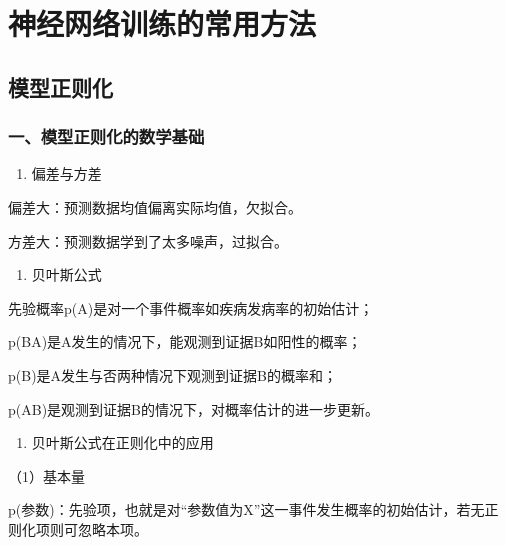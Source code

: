 \hypertarget{ux795eux7ecfux7f51ux7edcux8badux7ec3ux7684ux5e38ux7528ux65b9ux6cd5}{%
\chapter{神经网络训练的常用方法}\label{ux795eux7ecfux7f51ux7edcux8badux7ec3ux7684ux5e38ux7528ux65b9ux6cd5}}

\hypertarget{ux6a21ux578bux6b63ux5219ux5316}{%
\section{模型正则化}\label{ux6a21ux578bux6b63ux5219ux5316}}

\hypertarget{ux4e00ux6a21ux578bux6b63ux5219ux5316ux7684ux6570ux5b66ux57faux7840}{%
\subsection{一、模型正则化的数学基础}\label{ux4e00ux6a21ux578bux6b63ux5219ux5316ux7684ux6570ux5b66ux57faux7840}}

\begin{enumerate}
\def\labelenumi{\arabic{enumi}.}
\tightlist
\item
  偏差与方差
\end{enumerate}

偏差大：预测数据均值偏离实际均值，欠拟合。

方差大：预测数据学到了太多噪声，过拟合。

\begin{enumerate}
\def\labelenumi{\arabic{enumi}.}
\setcounter{enumi}{1}
\tightlist
\item
  贝叶斯公式
\end{enumerate}

先验概率p(A)是对一个事件概率如疾病发病率的初始估计；

p(B\textbar A)是A发生的情况下，能观测到证据B如阳性的概率；

p(B)是A发生与否两种情况下观测到证据B的概率和；

p(A\textbar B)是观测到证据B的情况下，对概率估计的进一步更新。

\begin{enumerate}
\def\labelenumi{\arabic{enumi}.}
\setcounter{enumi}{2}
\tightlist
\item
  贝叶斯公式在正则化中的应用
\end{enumerate}

（1）基本量

p(参数)：先验项，也就是对``参数值为X''这一事件发生概率的初始估计，若无正则化项则可忽略本项。


